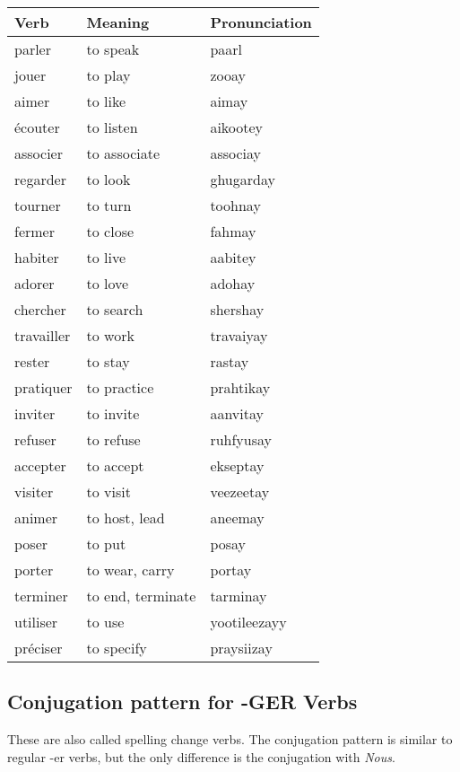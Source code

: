 \begin{longtable}{| l | l | l |}
\hline
Verb 		& Meaning 		& Pronunciation	\\
\hline
\endhead
parler		& to speak		& paarl			\\ 	\hline
jouer		& to play		& zooay			\\	\hline
aimer		& to like		& aimay			\\	\hline
\'ecouter	& to listen		& aikootey		\\	\hline
associer	& to associate	& associay		\\	\hline
regarder	& to look		& ghugarday		\\	\hline
tourner		& to turn		& toohnay		\\	\hline
fermer		& to close		& fahmay		\\	\hline
habiter		& to live		& aabitey		\\	\hline
adorer 		& to love		& adohay		\\	\hline
chercher	& to search		& shershay		\\	\hline
travailler	& to work		& travaiyay		\\	\hline
rester      & to stay       & rastay        \\  \hline
pratiquer   & to practice   & prahtikay     \\  \hline
inviter     & to invite     & aanvitay      \\  \hline
refuser     & to refuse     & ruhfyusay     \\  \hline
accepter    & to accept     & ekseptay      \\  \hline
visiter     & to visit      & veezeetay     \\  \hline
animer      & to host, lead & aneemay       \\  \hline
poser       & to put        & posay         \\  \hline
porter      & to wear, carry& portay        \\  \hline
terminer    & to end, terminate & tarminay  \\  \hline
utiliser    & to use        & yootileezayy  \\  \hline
pr\'eciser  & to specify    & praysiizay    \\  \hline
\end{longtable}

\subsection{Conjugation pattern for -GER Verbs}
These are also called spelling change verbs. The conjugation pattern is
similar to regular -er verbs, but the only difference is the conjugation
with \emph{Nous}.

